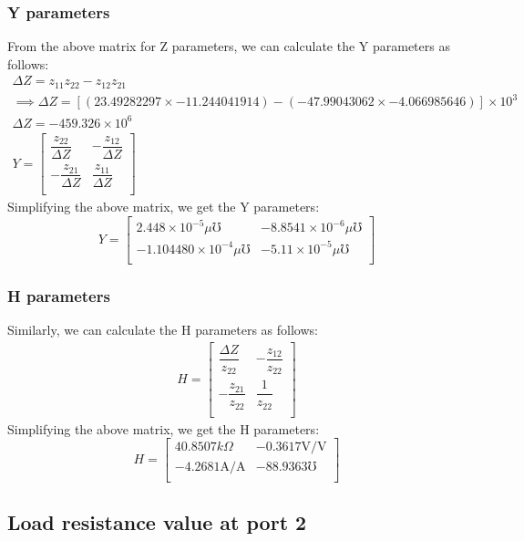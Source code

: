 \documentclass{article}[12pt]
\begin{document}
\subsubsection*{Y parameters}
From the above matrix for Z parameters, we can calculate the Y parameters as follows:
\begin{gather*}
    \Delta Z = z_{11}z_{22}-z_{12}z_{21}\\
    \implies \Delta Z = [(23.49282297\times-11.244041914)-(-47.99043062\times-4.066985646)]\times 10^3\\
    \Delta Z =-459.326\times 10^6\\
    Y = \begin{bmatrix}
        \dfrac{z_{22}}{\Delta Z}  & -\dfrac{z_{12}}{\Delta Z} \\[2ex]
        -\dfrac{z_{21}}{\Delta Z} & \dfrac{z_{11}}{\Delta Z}  \\[2ex]
    \end{bmatrix}
\end{gather*}
Simplifying the above matrix, we get the Y parameters:
$$ Y = \begin{bmatrix}
        2.448 \times 10^{-5}\mu\mho    & -8.8541\times10^{-6}\mu\mho \\[1ex]
        -1.104480\times 10^{-4}\mu\mho & -5.11\times 10^{-5}\mu\mho  \\[1ex]
    \end{bmatrix}
$$
\subsubsection*{H parameters}

Similarly, we can calculate the H parameters as follows:
\begin{gather*}
    H = \begin{bmatrix}
        \dfrac{\Delta Z}{z_{22}} & -\dfrac{z_{12}}{z_{22}} \\[2ex]
        -\dfrac{z_{21}}{z_{22}}  & \dfrac{1}{z_{22}}       \\[2ex]
    \end{bmatrix}
\end{gather*}
Simplifying the above matrix, we get the H parameters:
$$ H = \begin{bmatrix}
        40.8507k\Omega      & -0.3617 \mathrm{V/V} \\[1ex]
        -4.2681\mathrm{A/A} & -88.9363\mho         \\[1ex]
    \end{bmatrix}
$$

\subsection*{Load resistance value at port 2}
\end{document}
